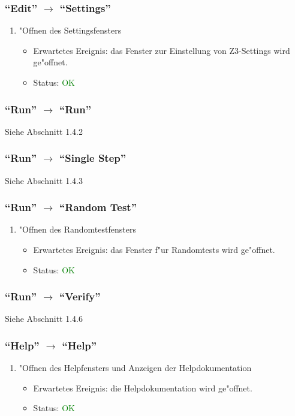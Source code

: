 \subsubsection{"`Edit"' $\rightarrow$ "`Settings"'}
\begin{enumerate}
\item "Offnen des Settingsfensters
\begin{itemize}
\item Erwartetes Ereignis: das Fenster zur Einstellung von Z3-Settings wird ge"offnet. 
\item Status: \textcolor{green}{OK}
\end{itemize}
\end{enumerate}
\subsubsection{"`Run"' $\rightarrow$ "`Run"'}
Siehe Abschnitt 1.4.2
\subsubsection{"`Run"' $\rightarrow$ "`Single Step"'}
Siehe Abschnitt 1.4.3
\subsubsection{"`Run"' $\rightarrow$ "`Random Test"'}
\begin{enumerate}
\item "Offnen des Randomtestfensters
\begin{itemize}
\item Erwartetes Ereignis: das Fenster f"ur Randomtests wird ge"offnet. 
\item Status: \textcolor{green}{OK}
\end{itemize}
\end{enumerate}
\subsubsection{"`Run"' $\rightarrow$ "`Verify"'}
Siehe Abschnitt 1.4.6
\subsubsection{"`Help"' $\rightarrow$ "`Help"'}
\begin{enumerate}
\item "Offnen des Helpfensters und Anzeigen der Helpdokumentation
\begin{itemize}
\item Erwartetes Ereignis: die Helpdokumentation wird ge"offnet. 
\item Status: \textcolor{green}{OK}
\end{itemize}
\end{enumerate}
